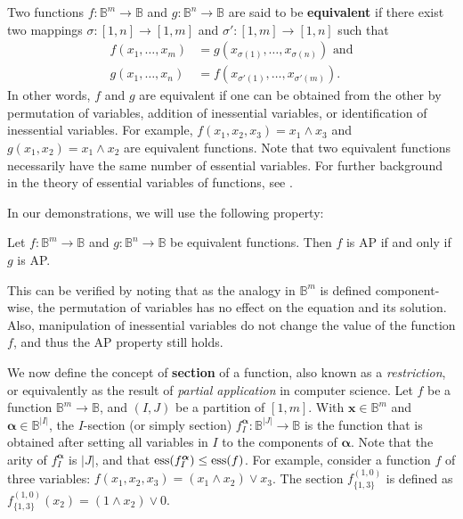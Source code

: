 Two functions $f\colon \mathbb{B}^m\to \mathbb{B}$ and $g\colon \mathbb{B}^n\to
\mathbb{B}$ are said to be {\bf equivalent} if there exist two mappings
$\sigma\colon
[1,n]\to [1,m]$ and $\sigma'\colon [1,m]\to [1,n]$ such that
\begin{align*}
  f(x_1,\ldots , x_m)&=g(x_{\sigma(1)},\ldots,x_{\sigma(n)}) \text{ and} \\
   g(x_1,\ldots , x_n)&=f(x_{\sigma'(1)},\ldots,x_{\sigma'(m)}).
\end{align*}
In other words, $f$ and $g$ are equivalent if one can be obtained from the
other by permutation of variables, addition of inessential variables, or
identification of inessential variables. For example, $f(x_1, x_2, x_3) = x_1
\wedge x_3$ and $g(x_1, x_2)  = x_1 \wedge x_2$ are equivalent functions. Note
that two equivalent functions necessarily have the same number of essential
variables. For further background in the theory of essential variables of
functions, see \cite{CouceiroTCS08, CouceiroDM09, SalomaaAASF63, WillardDM96}.

In our demonstrations, we will use the following property:

\begin{property}\label{equivalent_functions}
Let $f\colon \mathbb{B}^m\to \mathbb{B}$ and $g\colon \mathbb{B}^n\to
  \mathbb{B}$ be equivalent functions. Then $f$ is AP if and only if $g$ is AP.
\end{property}

This can be verified by noting that as the analogy in $\mathbb{B}^m$ is defined
component-wise, the permutation of variables has no effect on the equation and
its solution. Also, manipulation of inessential variables do not change the
value of the function $f$, and thus the AP property still holds.

We now define the concept of \textbf{section} of a function, also known as a
\textit{restriction}, or equivalently as the result of \textit{partial
application} in computer science. Let $f$ be a function $\mathbb{B}^m\to \mathbb{B}$, and $(I,
J)$ be a partition of $[1, m]$. With $\mathbf{x}
\in \mathbb{B}^m$ and $\boldsymbol{\alpha} \in \mathbb{B}^{|I|}$, the $I$-section (or simply
section) $f^{\boldsymbol{\alpha}}_I \colon \mathbb{B}^{|J|} \to \mathbb{B}$ is the function that
is obtained after setting all variables in $I$ to the components of
$\boldsymbol{\alpha}$. Note that the arity of $f^{\boldsymbol{\alpha}}_I$ is
$|J|$, and that $\operatorname{ess}(f^{\boldsymbol{\alpha}}_I) \leq \operatorname{ess}(f)$.
For example, consider a function $f$ of three variables: $f(x_1,x_2, x_3) = (x_1
\wedge x_2) \lor x_3$. The section $f^{(1, 0)}_{\{1, 3\}}$ is defined as $f^{(1,
0)}_{\{1, 3\}}(x_2) = (1 \wedge x_2) \lor 0$.

